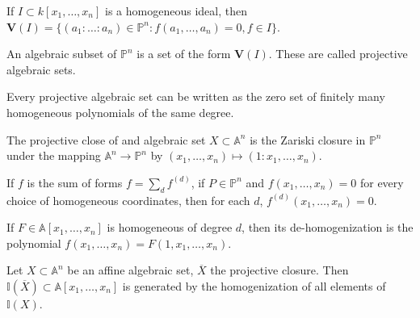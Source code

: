                 \begin{definition}
                    If $I\subset k[x_1,\hdots ,x_n]$ is a
                    homogeneous ideal, then
                    $\mathbf{V}(I)%
                     =\{(a_1:\hdots:a_{n})\in\mathbb{P}^{n}:%
                     f(a_{1},\hdots,a_{n})=0,f\in I\}$.
                \end{definition}
                \begin{definition}
                    An algebraic subset of $\mathbb{P}^{n}$ is a
                    set of the form $\mathbf{V}(I)$.
                    These are called projective algebraic sets.
                \end{definition}
                \begin{theorem}
                    Every projective algebraic set can be
                    written as the zero set of finitely many
                    homogeneous polynomials of the same degree.
                \end{theorem}
                \begin{definition}
                    The projective close of and algebraic set
                    $X\subset\mathbb{A}^n$ is the Zariski closure
                    in $\mathbb{P}^{n}$ under the mapping
                    $\mathbb{A}^{n}\rightarrow\mathbb{P}^n$
                    by $(x_{1},\hdots,x_{n})\mapsto(1:x_1,\hdots, x_n)$.
                \end{definition}
                \begin{theorem}
                    If $f$ is the sum of forms $f=\sum_{d}f^{(d)}$,
                    if $P\in \mathbb{P}^n$ and $f(x_1,\hdots, x_n)=0$
                    for every choice of homogeneous coordinates,
                    then for each $d$, $f^{(d)}(x_1,\hdots, x_n)=0$.
                \end{theorem}
                \begin{definition}
                    If $F\in \mathbb{A}[x_1,\hdots, x_n]$ is homogeneous
                    of degree $d$, then its de-homogenization is the
                    polynomial $f(x_1,\hdots, x_n)=F(1,x_1,\hdots, x_n)$.
                \end{definition}
                \begin{theorem}
                    Let $X\subset \mathbb{A}^n$ be an affine
                    algebraic set, $\overline{X}$ the projective closure. Then
                    $\mathbb{I}(\overline{X})\subset\mathbb{A}[x_1,\hdots,x_n]$
                    is generated by the homogenization of all
                    elements of $\mathbb{I}(X)$.
                \end{theorem}
